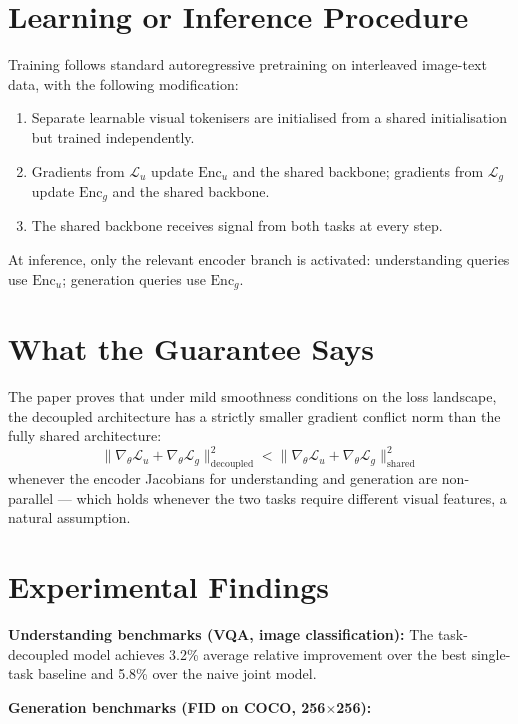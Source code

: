 \documentclass[10pt,twocolumn]{article}
\begin{document}
\section{Learning or Inference Procedure}

Training follows standard autoregressive pretraining on interleaved
image-text data, with the following modification:
\begin{enumerate}[itemsep=2pt,parsep=0pt]
  \item Separate learnable visual tokenisers are initialised from
    a shared initialisation but trained independently.
  \item Gradients from $\mathcal{L}_u$ update $\mathrm{Enc}_u$ and
    the shared backbone; gradients from $\mathcal{L}_g$ update
    $\mathrm{Enc}_g$ and the shared backbone.
  \item The shared backbone receives signal from both tasks at every step.
\end{enumerate}

At inference, only the relevant encoder branch is activated: understanding
queries use $\mathrm{Enc}_u$; generation queries use $\mathrm{Enc}_g$.

\section{What the Guarantee Says}

The paper proves that under mild smoothness conditions on the loss
landscape, the decoupled architecture has a strictly smaller gradient
conflict norm than the fully shared architecture:
\[
  \|\nabla_\theta \mathcal{L}_u + \nabla_\theta \mathcal{L}_g\|^2_\mathrm{decoupled}
  < \|\nabla_\theta \mathcal{L}_u + \nabla_\theta \mathcal{L}_g\|^2_\mathrm{shared}
\]
whenever the encoder Jacobians for understanding and generation are
non-parallel --- which holds whenever the two tasks require different
visual features, a natural assumption.

\section{Experimental Findings}

\textbf{Understanding benchmarks (VQA, image classification):}
The task-decoupled model achieves 3.2\% average relative improvement
over the best single-task baseline and 5.8\% over the naive joint model.

\textbf{Generation benchmarks (FID on COCO, 256$\times$256):}
\end{document}
